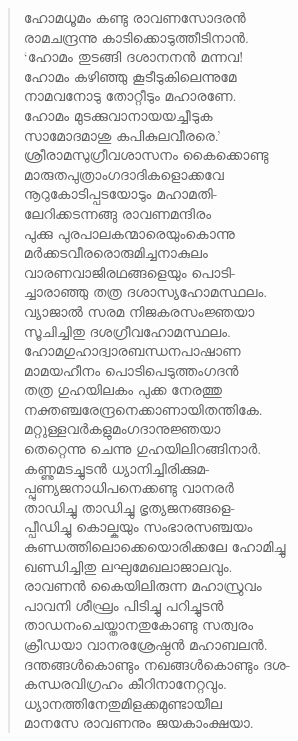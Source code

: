 \begin{verse}
ഹോമധൂമം കണ്ടു രാവണസോദരന്‍\\
രാമചന്ദ്രന്നു കാടിക്കൊടുത്തീടിനാന്‍.\\
‘ഹോമം തുടങ്ങി ദശാനനന്‍ മന്നവ!\\
ഹോമം കഴിഞ്ഞു കൂടീടുകിലെന്നുമേ\\
നാമവനോടു തോറ്റീടും മഹാരണേ.\\
ഹോമം മുടക്കുവാനായയച്ചീടുക\\
സാമോദമാശു കപികുലവീരരെ.’\\
ശ്രീരാമസുഗ്രീവശാസനം കൈക്കൊണ്ടു\\
മാരുതപുത്രാംഗദാദികളൊക്കവേ\\
നൂറുകോടിപ്പടയോടും മഹാമതി-\\
ലേറിക്കടന്നങ്ങു രാവണമന്ദിരം\\
പുക്കു പുരപാലകന്മാരെയുംകൊന്നു\\
മര്‍ക്കടവീരരൊരുമിച്ചനാകുലം\\
വാരണവാജിരഥങ്ങളെയും പൊടി-\\
ച്ചാരാഞ്ഞു തത്ര ദശാസ്യഹോമസ്ഥലം.\\
വ്യാജാല്‍ സരമ നിജകരസംജ്ഞയാ\\
സൂചിച്ചിതു ദശഗ്രീവഹോമസ്ഥലം.\\
ഹോമഗുഹാദ്വാരബന്ധനപാഷാണ\\
മാമയഹീനം പൊടിപെടുത്തംഗദന്‍\\
തത്ര ഗുഹയിലകം പുക്ക നേരത്തു\\
നക്തഞ്ചരേന്ദ്രനെക്കാണായിതന്തികേ.\\
മറ്റുള്ളവര്‍കളുമംഗദാനുജ്ഞയാ\\
തെറ്റെന്നു ചെന്നു ഗുഹയിലിറങ്ങിനാര്‍.\\
കണ്ണുമടച്ചുടന്‍ ധ്യാനിച്ചിരിക്കുമ-\\
പ്പുണ്യജനാധിപനെക്കണ്ടു വാനരര്‍\\
താഡിച്ചു താഡിച്ചു ഭൃത്യജനങ്ങളെ-\\
പ്പീഡിച്ചു കൊല്കയും സംഭാരസഞ്ചയം\\
കുണ്ഡത്തിലൊക്കെയൊരിക്കലേ ഹോമിച്ചു\\
ഖണ്ഡിച്ചിതു ലഘുമേഖലാജാലവും.\\
രാവണന്‍ കൈയിലിരുന്ന മഹാസ്രുവം\\
പാവനി ശീഘ്രം പിടിച്ചു പറിച്ചുടന്‍\\
താഡനംചെയ്താനതുകോണ്ടു സത്വരം\\
ക്രീഡയാ വാനരശ്രേഷ്ഠന്‍ മഹാബലന്‍.\\
ദന്തങ്ങള്‍കൊണ്ടും നഖങ്ങള്‍കൊണ്ടും ദശ-\\
കന്ധരവിഗ്രഹം കീറിനാനേറ്റവും.\\
ധ്യാനത്തിനേതുമിളക്കമുണ്ടായീല\\
മാനസേ രാവണനും ജയകാംക്ഷയാ.\\

\end{verse}

